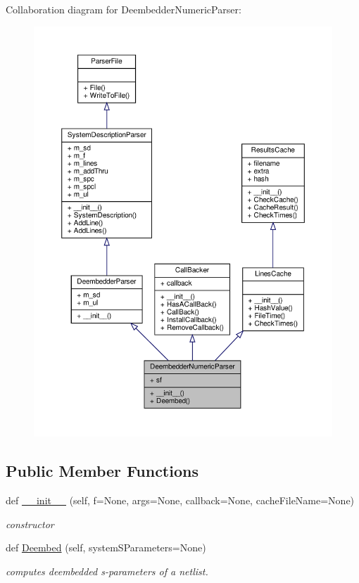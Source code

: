 Collaboration diagram for Deembedder\+Numeric\+Parser\+:\nopagebreak
\begin{figure}[H]
\begin{center}
\leavevmode
\includegraphics[width=350pt]{classSignalIntegrity_1_1Parsers_1_1DeembedderNumericParser_1_1DeembedderNumericParser__coll__graph}
\end{center}
\end{figure}
\subsection*{Public Member Functions}
\begin{DoxyCompactItemize}
\item 
def \hyperlink{classSignalIntegrity_1_1Parsers_1_1DeembedderNumericParser_1_1DeembedderNumericParser_a5ce77900c33ce9b681aebb5c527ab92a}{\+\_\+\+\_\+init\+\_\+\+\_\+} (self, f=None, args=None, callback=None, cache\+File\+Name=None)
\begin{DoxyCompactList}\small\item\em constructor \end{DoxyCompactList}\item 
def \hyperlink{classSignalIntegrity_1_1Parsers_1_1DeembedderNumericParser_1_1DeembedderNumericParser_aa04b7e5ad8ffcfb9ef4f6f1fd03594b3}{Deembed} (self, system\+S\+Parameters=None)
\begin{DoxyCompactList}\small\item\em computes deembedded s-\/parameters of a netlist. \end{DoxyCompactList}\end{DoxyCompactItemize}


